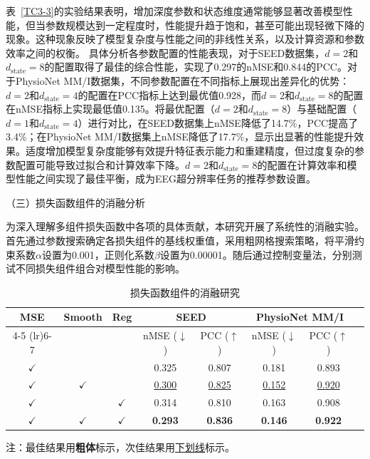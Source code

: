 表~\ref{TC3-3}的实验结果表明，增加深度参数和状态维度通常能够显著改善模型性能，但当参数规模达到一定程度时，性能提升趋于饱和，甚至可能出现轻微下降的现象。这种现象反映了模型复杂度与性能之间的非线性关系，以及计算资源和参数效率之间的权衡。
具体分析各参数配置的性能表现，对于SEED数据集，$d=2$和$d_{\text{state}}=8$的配置取得了最佳的综合性能，实现了0.297的nMSE和0.844的PCC。对于PhysioNet MM/I数据集，不同参数配置在不同指标上展现出差异化的优势：$d=2$和$d_{\text{state}}=4$的配置在PCC指标上达到最优值0.928，而$d=2$和$d_{\text{state}}=8$的配置在nMSE指标上实现最低值0.135。将最优配置（$d=2$和$d_{\text{state}}=8$）与基础配置（$d=1$和$d_{\text{state}}=4$）进行对比，在SEED数据集上nMSE降低了14.7\%，PCC提高了3.4\%；在PhysioNet MM/I数据集上nMSE降低了17.7\%，显示出显著的性能提升效果。适度增加模型复杂度能够有效提升特征表示能力和重建精度，但过度复杂的参数配置可能导致过拟合和计算效率下降。$d=2$和$d_{\text{state}}=8$的配置在计算效率和模型性能之间实现了最佳平衡，成为EEG超分辨率任务的推荐参数设置。


（三）损失函数组件的消融分析

为深入理解多组件损失函数中各项的具体贡献，本研究开展了系统性的消融实验。首先通过参数搜索确定各损失组件的基线权重值，采用粗网格搜索策略，将平滑约束系数$\alpha$设置为0.001，正则化系数$\beta$设置为0.00001。随后通过控制变量法，分别测试不同损失组件组合对模型性能的影响。


\begin{table}[htb]
\centering
\caption{损失函数组件的消融研究}
\label{tab:TC3-4}
\begin{tabular}{cccccccc}
\toprule
\multirow{2}{*}{MSE} & \multirow{2}{*}{Smooth} & \multirow{2}{*}{Reg} & \multicolumn{2}{c}{SEED} & \multicolumn{2}{c}{PhysioNet MM/I} \\
\cmidrule(lr){4-5} \cmidrule(lr){6-7}
 &  &  & nMSE ($\downarrow$) & PCC ($\uparrow$) & nMSE ($\downarrow$) & PCC ($\uparrow$) \\
\midrule
$\checkmark$ &   &   & 0.325 & 0.807 & 0.181 & 0.893 \\
$\checkmark$ & $\checkmark$ &   & \uline{0.300} & \uline{0.825} & \uline{0.152} & \uline{0.920} \\
$\checkmark$ &   & $\checkmark$ & 0.314 & 0.810 & 0.163 & 0.908 \\
$\checkmark$ & $\checkmark$ & $\checkmark$ & \textbf{0.293} & \textbf{0.836} & \textbf{0.146} & \textbf{0.922} \\
\bottomrule
\end{tabular}
\begin{tablenotes}
\footnotesize
\item[]\centering 注：最佳结果用\textbf{粗体}标示，次佳结果用\underline{下划线}标示。
\end{tablenotes}
\end{table}

